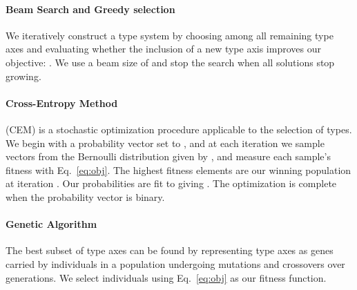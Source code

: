 \documentclass[letterpaper]{article}
\begin{document}
\paragraph{Beam Search and Greedy selection} We iteratively construct a type system by choosing among all remaining type axes and evaluating whether the inclusion of a new type axis improves our objective: . We use a beam size of  and stop the search when all solutions stop growing.
\paragraph{Cross-Entropy Method} 
(CEM) \cite{rubinstein1999cross} is a stochastic optimization procedure applicable to the selection of types. We begin with a probability vector  set to , and at each iteration we sample  vectors  from the Bernoulli distribution given by , and measure each sample's fitness with Eq.~\ref{eq:obj}. The  highest fitness elements are our winning population  at iteration . Our probabilities are fit to  giving . The optimization is complete when the probability vector is binary.

\paragraph{Genetic Algorithm} The best subset of type axes can be found by representing type axes as genes carried by  individuals in a population undergoing mutations and crossovers \cite{harvey2009microbial} over  generations. We select individuals using Eq.~\ref{eq:obj} as our fitness function.
\end{document}
